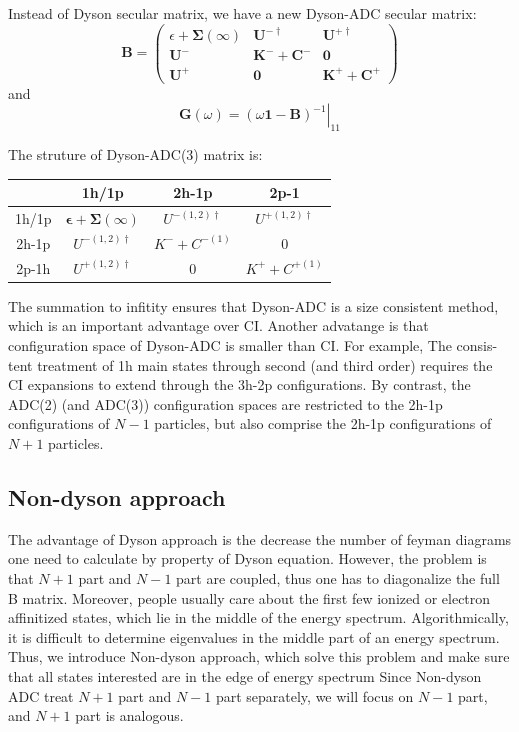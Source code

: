 Instead of Dyson secular matrix, we have a new Dyson-ADC secular matrix:
\begin{equation}
	\boldsymbol{B}=\left( \begin{array}{ccc}{\epsilon+\mathbf{\Sigma}(\infty)} & {\boldsymbol{U}^{-\dagger}} & {\boldsymbol{U}^{+\dagger}} \\ {\boldsymbol{U}^{-}} & {\boldsymbol{K}^{-}+\boldsymbol{C}^{-}} & {\mathbf{0}} \\ {\boldsymbol{U}^{+}} & {\boldsymbol{0}} & {\boldsymbol{K}^{+}+\boldsymbol{C}^{+}}\end{array}\right)
\end{equation}
and
\begin{equation}
	\boldsymbol{G}(\omega)=\left.(\omega \mathbf{1}-\boldsymbol{B})^{-1}\right|_{11}
\end{equation}

The struture of Dyson-ADC(3) matrix is:
\begin{table}
	\centering
	\begin{tabular}{c|c|c|c|}
		   &   1h/1p  &   2h-1p &  2p-1
		\\
		\hline
		1h/1p  &  $\boldsymbol{\epsilon}+\boldsymbol{\Sigma}(\infty)$ & $U^{-(1,2)\dagger}$ & $ U^{+(1,2)\dagger} $
		\\
		\hline
		2h-1p &  $U^{-(1,2)\dagger}$ & $K^{-}+C^{-(1)}$ & 0
		\\
		\hline
		2p-1h &  $U^{+(1,2)\dagger}$ & 0 & $K^{+}+C^{+(1)}$
		\\
		\hline
	\end{tabular}
\end{table}

The summation to infitity ensures that Dyson-ADC is a size consistent method, which is an important advantage over CI.
Another advatange is that configuration space of Dyson-ADC is smaller than CI.
For example, The consis- tent treatment of 1h main states through second (and third order) requires the CI expansions to extend through the 3h-2p configurations.
By contrast, the ADC(2) (and ADC(3)) configuration spaces are restricted to the 2h-1p configurations of $N−1$ particles, but also comprise the 2h-1p configurations of $N+1$ particles.

\subsection{Non-dyson approach}
The advantage of Dyson approach is the decrease the number of feyman diagrams one need to calculate by property of Dyson equation.
However, the problem is that $N+1$ part and $N-1$ part are coupled, thus one has to diagonalize the full B matrix.
Moreover, people usually care about the first few ionized or electron affinitized states, which lie in the middle of the energy spectrum.
Algorithmically, it is difficult to determine eigenvalues in the middle part of an energy spectrum.
Thus, we introduce Non-dyson approach, which solve this problem and make sure that all states interested are in the edge of energy spectrum
Since Non-dyson ADC treat $N+1$ part and $N-1$ part separately, we will focus on $N-1$ part, and $N+1$ part is analogous.

